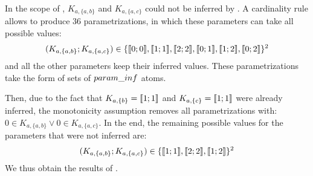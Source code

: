 \begin{example}
In the scope of , $K_{a,\{a,b\}}$ and $K_{a,\{a,c\}}$ could not be inferred by .
A cardinality rule allows to produce 36 parametrizations, in which these parameters can take all possible values:
\begin{align*}
  (K_{a,\{a,b\}} ; K_{a,\{a,c\}}) \in \{ \llbracket 0 ; 0 \rrbracket , \llbracket 1 ; 1 \rrbracket , \llbracket 2 ; 2 \rrbracket , \llbracket 0 ; 1 \rrbracket , \llbracket 1 ; 2 \rrbracket , \llbracket 0 ; 2 \rrbracket \}^2
\end{align*}
and all the other parameters keep their inferred values.
These parametrizations take the form of sets of $param\_inf$ atoms.

Then, due to the fact that $K_{a,\{b\}} = \llbracket 1 ; 1 \rrbracket$ and $K_{a,\{c\}} = \llbracket 1 ; 1 \rrbracket$ were already inferred,
the monotonicity assumption removes all parametrizations with: $0 \in K_{a,\{a,b\}} \vee 0 \in K_{a,\{a,c\}}$.
In the end, the remaining possible values for the parameters that were not inferred are:
\begin{align*}
  (K_{a,\{a,b\}} ; K_{a,\{a,c\}}) \in \{ \llbracket 1 ; 1 \rrbracket , \llbracket 2 ; 2 \rrbracket , \llbracket 1 ; 2 \rrbracket \}^2
\end{align*}
We thus obtain the results of .
\end{example}




